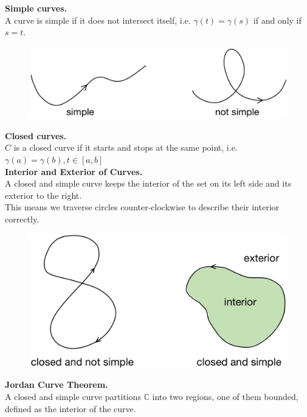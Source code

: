 \documentclass[11pt]{article}
\begin{document}
\textbf{Simple curves.} \\
A curve is simple if it does not intersect itself, i.e. $\gamma(t) = \gamma(s)$ if and only if $s = t$. \\
\begin{figure}[H]
\includegraphics[scale = 0.18]{11_2}
\centering
\end{figure}
\textbf{Closed curves.} \\
$C$ is a closed curve if it starts and stops at the same point, i.e. $\gamma(a) = \gamma(b), t \in [a, b]$ \\
\newline
\textbf{Interior and Exterior of Curves.} \\
A closed and simple curve keeps the interior of the set on its left side and its exterior to the right. \\
This means we traverse circles counter-clockwise to describe their interior correctly. 
\begin{figure}[H]
\includegraphics[scale = 0.18]{11_3}
\centering
\end{figure}
\textbf{Jordan Curve Theorem.} \\
A closed and simple curve partitions $\mathbb{C}$ into two regions, one of them bounded, defined as the interior of the curve. 
\end{document}
